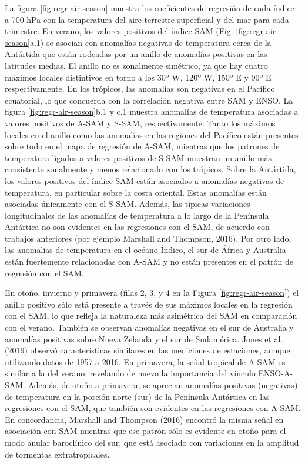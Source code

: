 \documentclass[12pt,oneside]{reedthesis}
\begin{document}
La figura \ref{fig:regr-air-season} muestra los coeficientes de regresión de cada índice a 700 hPa con la temperatura del aire terrestre superficial y del mar para cada trimestre.
En verano, los valores positivos del índice SAM (Fig. \ref{fig:regr-air-season}a.1) se asocian con anomalías negativas de temperatura cerca de la Antártida que están rodeadas por un anillo de anomalías positivas en las latitudes medias.
El anillo no es zonalmente simétrico, ya que hay cuatro máximos locales distintivos en torno a los 30º W, 120º W, 150º E y 90º E respectivamente.
En los trópicos, las anomalías son negativas en el Pacífico ecuatorial, lo que concuerda con la correlación negativa entre SAM y ENSO.
La figura \ref{fig:regr-air-season}b.1 y c.1 muestra anomalías de temperatura asociadas a valores positivos de A-SAM y S-SAM, respectivamente.
Tanto los máximos locales en el anillo como las anomalías en las regiones del Pacífico están presentes sobre todo en el mapa de regresión de A-SAM, mientras que los patrones de temperatura ligados a valores positivos de S-SAM muestran un anillo más consistente zonalmente y menos relacionado con los trópicos.
Sobre la Antártida, los valores positivos del índice SAM están asociados a anomalías negativas de temperatura, en particular sobre la costa oriental.
Estas anomalías están asociadas únicamente con el S-SAM.
Además, las típicas variaciones longitudinales de las anomalías de temperatura a lo largo de la Península Antártica no son evidentes en las regresiones con el SAM, de acuerdo con trabajos anteriores (por ejemplo Marshall and Thompson, 2016).
Por otro lado, las anomalías de temperatura en el océano Índico, el sur de África y Australia están fuertemente relacionadas con A-SAM y no están presentes en el patrón de regresión con el SAM.

En otoño, invierno y primavera (filas 2, 3, y 4 en la Figura \ref{fig:regr-air-season}) el anillo positivo sólo está presente a través de sus máximos locales en la regresión con el SAM, lo que refleja la naturaleza más asimétrica del SAM en comparación con el verano.
También se observan anomalías negativas en el sur de Australia y anomalías positivas sobre Nueva Zelanda y el sur de Sudamérica.
Jones et al. (2019) observó características similares en las mediciones de estaciones, aunque utilizando datos de 1957 a 2016.
En primavera, la señal tropical de A-SAM es similar a la del verano, revelando de nuevo la importancia del vínculo ENSO-A-SAM.
Además, de otoño a primavera, se aprecian anomalías positivas (negativas) de temperatura en la porción norte (sur) de la Península Antártica en las regresiones con el SAM, que también son evidentes en las regresiones con A-SAM. En concordancia, Marshall and Thompson (2016) encontró la misma señal en asociación con SAM mientras que ese patrón sólo es evidente en otoño para el modo anular baroclínico del sur, que está asociado con variaciones en la amplitud de tormentas extratropicales.
\end{document}
